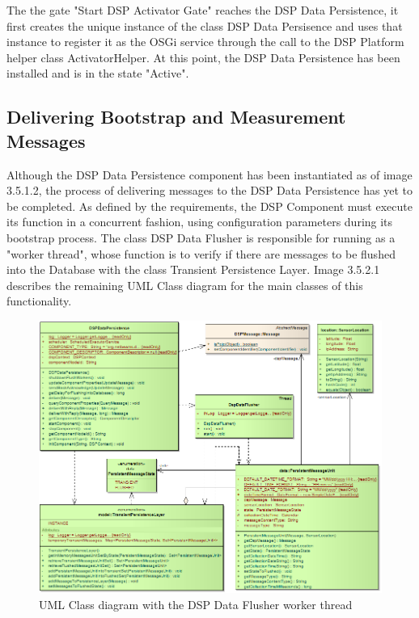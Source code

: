 The the gate "Start DSP Activator Gate" reaches the DSP Data Persistence, it
first creates the unique instance of the class DSP Data Persisence and uses
that instance to register it as the OSGi service through the call to the DSP
Platform helper class ActivatorHelper. At this point, the DSP Data Persistence
has been installed and is in the state "Active".

\subsection{Delivering Bootstrap and Measurement Messages}

Although the DSP Data Persistence component has been instantiated as of image
3.5.1.2, the process of delivering messages to the DSP Data Persistence has yet
to be completed. As defined by the requirements, the DSP Component must execute
its function in a concurrent fashion, using configuration parameters during its
bootstrap process. The class DSP Data Flusher is responsible for running as a
"worker thread", whose function is to verify if there are messages to be
flushed into the Database with the class Transient Persistence Layer. Image
3.5.2.1 describes the remaining UML Class diagram for the main classes of this
functionality.

\begin{figure}[!b]
  \centering
  \includegraphics[scale=0.5]{../diagrams/DSP-DataPersistence-Flusher-Classes}
  \caption{UML Class diagram with the DSP Data Flusher worker thread}
  \label{fig:DSP-DataPersistence-Flusher-Classes}
\end{figure}

